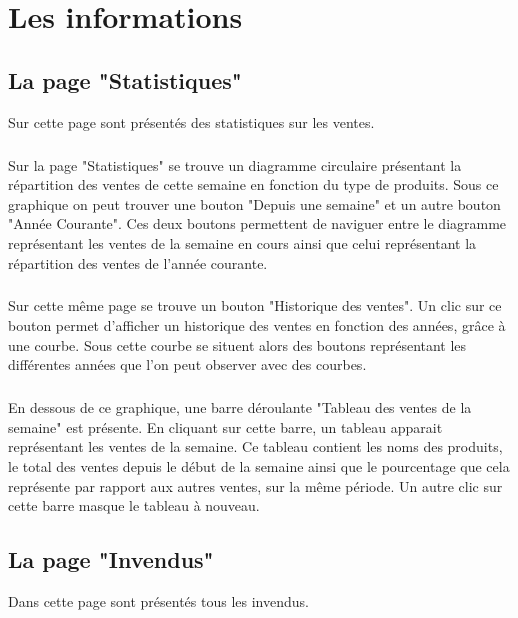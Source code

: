 \chapter{Les informations}

\section{La page "Statistiques"}
Sur cette page sont présentés des statistiques sur les ventes.

\paragraph{}
Sur la page "Statistiques" se trouve un diagramme circulaire présentant la 
répartition des ventes de cette semaine en fonction du type de produits. Sous 
ce graphique on peut trouver une bouton "Depuis une semaine" et un autre bouton 
"Année Courante". Ces deux boutons permettent de naviguer entre le diagramme 
représentant les ventes de la semaine en cours ainsi que celui représentant la 
répartition des ventes de l'année courante.

\paragraph{}
Sur cette même page se trouve un bouton "Historique des ventes". Un clic sur ce 
bouton permet d'afficher un historique des ventes en fonction des années, 
grâce à une courbe. Sous cette courbe se situent alors des boutons représentant 
les différentes années que l'on peut observer avec des courbes.

\paragraph{}
En dessous de ce graphique, une barre déroulante "Tableau des ventes de la 
semaine" est présente. En cliquant sur cette barre, un tableau apparait 
représentant les ventes de la semaine. Ce tableau contient les noms des 
produits, le total des ventes depuis le début de la semaine ainsi que le 
pourcentage que cela représente par rapport aux autres ventes, sur la même 
période. Un autre clic sur cette barre masque le tableau à nouveau.



\section{La page "Invendus"}
Dans cette page sont présentés tous les invendus.

